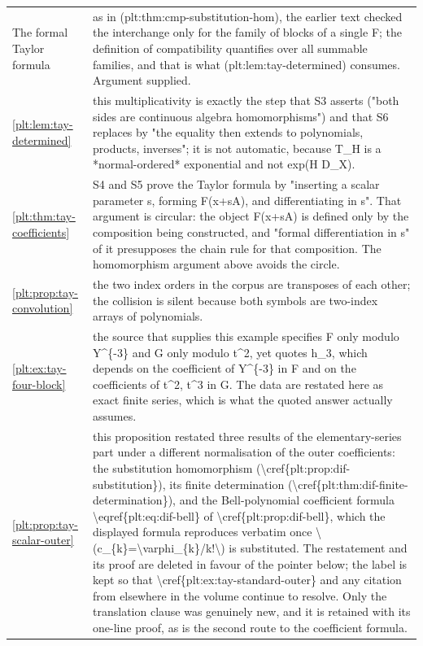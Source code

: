\documentclass[11pt,oneside]{article}
\theoremstyle{plain}
\theoremstyle{definition}
\theoremstyle{remark}
\begin{document}
\begin{longtable}{@{}p{} p{}@{}}
The formal Taylor formula & as in (plt:thm:cmp-substitution-hom), the earlier text checked the interchange only for the family of blocks of a single F; the definition of compatibility quantifies over all summable families, and that is what (plt:lem:tay-determined) consumes. Argument supplied.\\
\cref{plt:lem:tay-determined} & this multiplicativity is exactly the step that S3 asserts ("both sides are continuous algebra homomorphisms") and that S6 replaces by "the equality then extends to polynomials, products, inverses"; it is not automatic, because T\_H is a *normal-ordered* exponential and not exp(H D\_X).\\
\cref{plt:thm:tay-coefficients} & S4 and S5 prove the Taylor formula by "inserting a scalar parameter s, forming F(x+sA), and differentiating in s". That argument is circular: the object F(x+sA) is defined only by the composition being constructed, and "formal differentiation in s" of it presupposes the chain rule for that composition. The homomorphism argument above avoids the circle.\\
\cref{plt:prop:tay-convolution} & the two index orders in the corpus are transposes of each other; the collision is silent because both symbols are two-index arrays of polynomials.\\
\cref{plt:ex:tay-four-block} & the source that supplies this example specifies F only modulo Y\textasciicircum \{-3\} and G only modulo t\textasciicircum 2, yet quotes h\_3, which depends on the coefficient of Y\textasciicircum \{-3\} in F and on the coefficients of t\textasciicircum 2, t\textasciicircum 3 in G. The data are restated here as exact finite series, which is what the quoted answer actually assumes.\\
\cref{plt:prop:tay-scalar-outer} & this proposition restated three results of the elementary-series part under a different normalisation of the outer coefficients: the substitution homomorphism (\textbackslash cref\{plt:prop:dif-substitution\}), its finite determination (\textbackslash cref\{plt:thm:dif-finite-determination\}), and the Bell-polynomial coefficient formula \textbackslash eqref\{plt:eq:dif-bell\} of \textbackslash cref\{plt:prop:dif-bell\}, which the displayed formula reproduces verbatim once \textbackslash (c\_\{k\}=\textbackslash varphi\_\{k\}/k!\textbackslash ) is substituted. The restatement and its proof are deleted in favour of the pointer below; the label is kept so that \textbackslash cref\{plt:ex:tay-standard-outer\} and any citation from elsewhere in the volume continue to resolve. Only the translation clause was genuinely new, and it is retained with its one-line proof, as is the second route to the coefficient formula.\\

\end{longtable}
\end{document}
